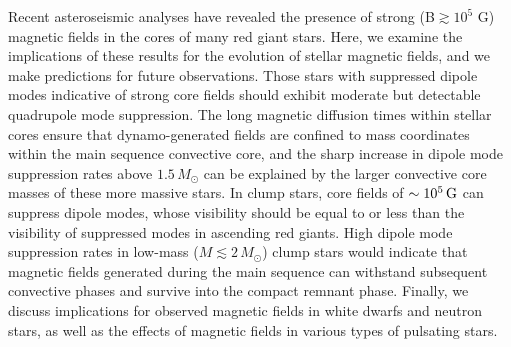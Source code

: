 Recent asteroseismic analyses have revealed the presence of strong (B$\gtrsim 10^5$ G) magnetic fields in the cores of many red giant stars. 
Here, we examine the implications of these results for the  evolution of stellar  magnetic fields, and we make predictions for future observations. Those stars with suppressed dipole modes indicative of strong core fields should exhibit moderate but detectable quadrupole mode suppression.
The long magnetic diffusion times within stellar cores ensure that dynamo-generated fields are confined to mass coordinates within the main sequence convective core, and the sharp increase in dipole mode suppression rates above $1.5 \, M_\odot$ can be explained by the larger convective core masses of these more massive stars.
In clump stars, core fields of $\sim 10^5 \, {\rm G}$ can suppress dipole modes, whose visibility should be equal to or less than the visibility of suppressed modes in ascending red giants. High dipole mode suppression rates in low-mass ($M \lesssim 2 \, M_\odot$) clump stars would indicate that magnetic fields generated during the main sequence can withstand subsequent convective phases and survive into the compact remnant phase. Finally, we discuss implications for observed magnetic fields in white dwarfs and neutron stars, as well as the effects of magnetic fields in various types of pulsating stars.
  
  
  
  
  
  
  